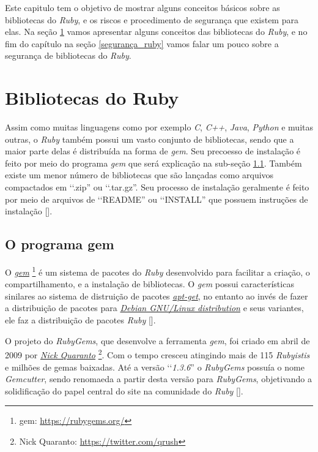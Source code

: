 Este capitulo tem o objetivo de mostrar alguns conceitos básicos sobre as bibliotecas do
\emph{Ruby}, e os riscos e procedimento de segurança que existem para elas.
Na seção \ref{bibliotecas_do_ruby} vamos apresentar alguns conceitos das bibliotecas do
\emph{Ruby}, e no fim do capítulo na seção \ref{segurança_ruby} vamos falar um pouco
sobre a segurança de bibliotecas do \emph{Ruby}.

\section{Bibliotecas do Ruby}
\label{bibliotecas_do_ruby}

Assim como muitas linguagens como por exemplo \emph{C}, \emph{C++}, \emph{Java}, \emph{Python} e muitas
outras, o \emph{Ruby} também possui um vasto conjunto de bibliotecas, sendo que a maior parte
delas é distribuída na forma de \emph{gem}. Seu precoesso de instalação é feito por meio do programa
\emph{gem} que será explicação na sub-seção \ref{subsection:gem}. Também existe um menor número de
bibliotecas que são lançadas como arquivos compactados em ‘‘.zip'' ou ‘‘.tar.gz''. Seu processo
de instalação geralmente é feito por meio de arquivos de ‘‘README'' ou ‘‘INSTALL'' que possuem
instruções de instalação [].

\subsection{O programa gem}
\label{subsection:gem}

O \emph{\href{https://rubygems.org/}{gem}} \footnote{gem: \url{https://rubygems.org/}} é um sistema
de pacotes do \emph{Ruby} desenvolvido para facilitar a criação, o compartilhamento, e a instalação de
bibliotecas. O \emph{gem} possui características sinilares ao sistema de distruição de pacotes
\emph{\href{https://packages.qa.debian.org/a/apt.html}{apt-get}}, no entanto ao invés de fazer a distribuição
de pacotes para \emph{\href{https://www.debian.org/}{Debian GNU/Linux distribution}} e seus variantes, ele faz
a distribuição de pacotes \emph{Ruby} [].

O projeto do \emph{RubyGems}, que desenvolve a ferramenta \emph{gem}, foi criado em abril de 2009 por
\emph{\href{https://twitter.com/qrush}{Nick Quaranto}} \footnote{Nick Quaranto: \url{https://twitter.com/qrush}}.
Com o tempo cresceu atingindo mais de 115 \emph{Rubyistis} e milhões de gemas baixadas. Até a versão
‘‘\emph{1.3.6}'' o \emph{RubyGems} possuía o nome \emph{Gemcutter}, sendo renomaeda a partir desta versão
para \emph{RubyGems}, objetivando a solidificação do papel central do site na comunidade do \emph{Ruby}
[].

